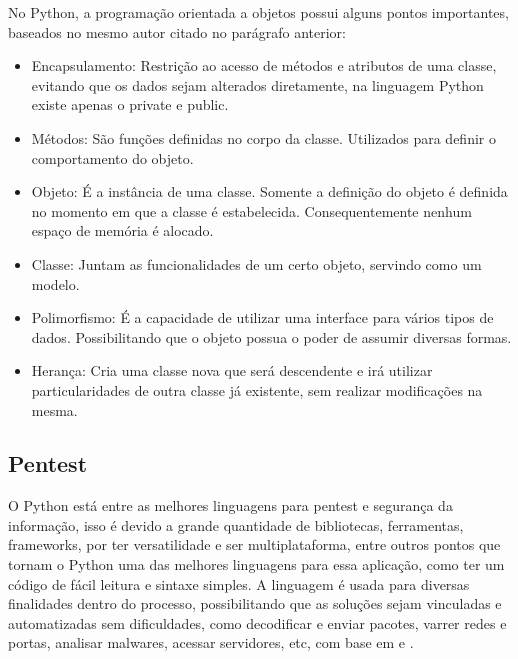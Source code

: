         No Python, a programação orientada a objetos possui alguns pontos importantes, baseados no mesmo autor citado no parágrafo anterior: 
        \begin{itemize}
        	\item Encapsulamento: Restrição ao acesso de métodos e atributos de uma classe, evitando que os dados sejam alterados diretamente, na linguagem Python existe apenas o private e public.
        	
        	\item Métodos: São funções definidas no corpo da classe. Utilizados para definir o comportamento do objeto. 
        	
        	\item Objeto: É a instância de uma classe. Somente a definição do objeto é definida no momento em que a classe é estabelecida. Consequentemente nenhum espaço de memória é alocado.
        	
        	\item Classe: Juntam as funcionalidades de um certo objeto, servindo como um modelo.
        	
        	\item Polimorfismo: É a capacidade de utilizar uma interface para vários tipos de dados. Possibilitando que o objeto possua o poder de assumir diversas formas. 
        	
        	\item Herança: Cria uma classe nova que será descendente e irá utilizar particularidades de outra classe já existente, sem realizar modificações na mesma.
        	 
        	
        \end{itemize}


        \subsection{Pentest} 
        O Python está entre as melhores linguagens para pentest e segurança da informação, isso é devido a grande quantidade de bibliotecas, ferramentas, frameworks, por ter versatilidade e ser multiplataforma, entre outros pontos que tornam o Python uma das melhores linguagens para essa aplicação, como ter um código de fácil leitura e sintaxe simples. A linguagem é usada para diversas finalidades dentro do processo, possibilitando que as soluções sejam vinculadas e automatizadas sem dificuldades, como decodificar e enviar pacotes, varrer redes e portas, analisar malwares, acessar servidores, etc, com base em \cite{Moreno2018} e \cite{Seitz2015}.
        
